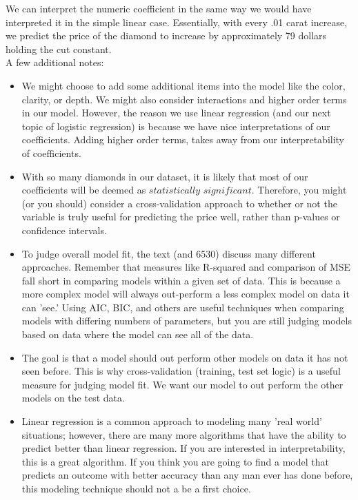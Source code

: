 \documentclass{article}
\begin{document}
We can interpret the numeric coefficient in the same way we would have interpreted it in the simple linear case. Essentially, with every .01 carat increase, we predict the price of the diamond to increase by approximately 79 dollars holding the cut constant.\\[.25cm]

A few additional notes:

\begin{itemize}
\item[] We might choose to add some additional items into the model like the color, clarity, or depth.  We might also consider interactions and higher order terms in our model.  However, the reason we use linear regression (and our next topic of logistic regression) is because we have nice interpretations of our coefficients.  Adding higher order terms, takes away from our interpretability of coefficients.  

\item[] With so many diamonds in our dataset, it is likely that most of our coefficients will be deemed as $statistically$ $significant$.  Therefore, you might (or you should) consider a cross-validation approach to whether or not the variable is truly useful for predicting the price well, rather than p-values or confidence intervals.

\item[] To judge overall model fit, the text (and 6530) discuss many different approaches.  Remember that measures like R-squared and comparison of MSE fall short in comparing models within a given set of data.  This is because a more complex model will always out-perform a less complex model on data it can 'see.'  Using AIC, BIC, and others are useful techniques when comparing models with differing numbers of parameters, but you are still judging models based on data where the model can see all of the data.   

\item[] The goal is that a model should out perform other models on data it has not seen before.  This is why cross-validation (training, test set logic) is a useful measure for judging model fit.  We want our model to out perform the other models on the test data.

\item[] Linear regression is a common approach to modeling many 'real world' situations; however, there are many more algorithms that have the ability to predict better than linear regression.  If you are interested in interpretability, this is a great algorithm.  If you think you are going to find a model that predicts an outcome with better accuracy than any man ever has done before, this modeling technique should not a be a first choice.
\end{itemize}
\end{document}
